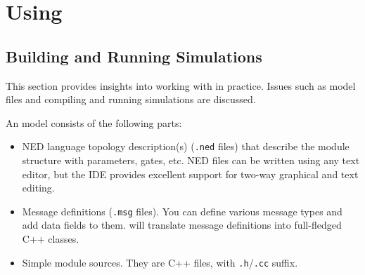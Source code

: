 %
%
%
%
%
%


\section{Using {\opp}}


\subsection{Building and Running Simulations}

This section provides insights into working with {\opp} in practice.
Issues such as model files and compiling and running simulations are
discussed.

An {\opp} model consists of the following parts:
\begin{itemize}
  \item{NED language topology description(s) (\texttt{.ned} files)
    that describe the module structure with parameters, gates, etc.
    NED files can be written using any text editor, but the {\opp} IDE
    provides excellent support for two-way graphical and text editing.}
  \item{Message definitions (\texttt{.msg} files). You can define various message
    types and add data fields to them. {\opp} will translate message definitions
    into full-fledged C++ classes.}
  \item{Simple module sources. They are C++ files, with \texttt{.h}/\texttt{.cc} suffix.}
\end{itemize}

